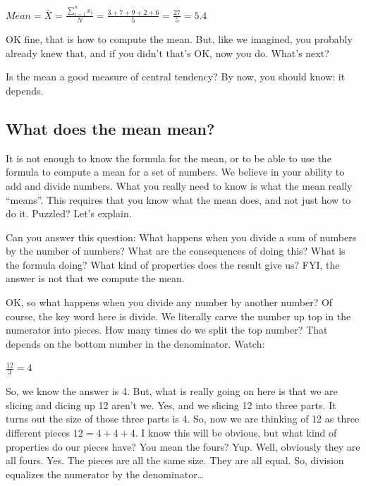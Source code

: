 \documentclass[]{book}
\begin{document}
\(Mean = \bar{X} = \frac{\sum_{i=1}^{n} x_{i}}{N} = \frac{3+7+9+2+6}{5} = \frac{27}{5} = 5.4\)

OK fine, that is how to compute the mean. But, like we imagined, you probably already knew that, and if you didn't that's OK, now you do. What's next?

Is the mean a good measure of central tendency? By now, you should know: it depends.

\hypertarget{what-does-the-mean-mean}{%
\subsection{What does the mean mean?}\label{what-does-the-mean-mean}}

It is not enough to know the formula for the mean, or to be able to use the formula to compute a mean for a set of numbers. We believe in your ability to add and divide numbers. What you really need to know is what the mean really ``means''. This requires that you know what the mean does, and not just how to do it. Puzzled? Let's explain.

Can you answer this question: What happens when you divide a sum of numbers by the number of numbers? What are the consequences of doing this? What is the formula doing? What kind of properties does the result give us? FYI, the answer is not that we compute the mean.

OK, so what happens when you divide any number by another number? Of course, the key word here is divide. We literally carve the number up top in the numerator into pieces. How many times do we split the top number? That depends on the bottom number in the denominator. Watch:

\(\frac{12}{3} = 4\)

So, we know the answer is 4. But, what is really going on here is that we are slicing and dicing up 12 aren't we. Yes, and we slicing 12 into three parts. It turns out the size of those three parts is 4. So, now we are thinking of 12 as three different pieces \(12 = 4 + 4 + 4\). I know this will be obvious, but what kind of properties do our pieces have? You mean the fours? Yup. Well, obviously they are all fours. Yes. The pieces are all the same size. They are all equal. So, division equalizes the numerator by the denominator\ldots{}
\end{document}
